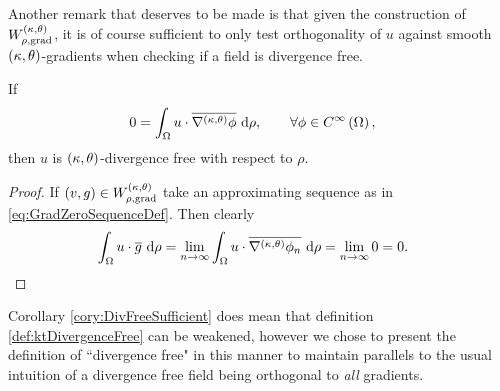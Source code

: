 Another remark that deserves to be made is that given the construction of $W^{\left( \kappa, \theta \right)}_{\rho,\mathrm{grad}}$, it is of course sufficient to only test orthogonality of $u$ against smooth $\left( \kappa, \theta \right)$-gradients when checking if a field is divergence free.
\begin{cory} \label{cory:DivFreeSufficient}
	If
	\begin{align*}
		0 &= \int_{\Omega} u\cdot\overline{\nabla^{\left( \kappa, \theta \right)}\phi}  \ \mathrm{d}\rho, \qquad\forall\phi\in C^{\infty}\left( \Omega \right),
	\end{align*}
	then $u$ is $\left( \kappa, \theta \right)$-divergence free with respect to $\rho$.
\end{cory}
\begin{proof}
	If $\left( v,g \right)\in W^{\left( \kappa, \theta \right)}_{\rho,\mathrm{grad}}$ take an approximating sequence as in \eqref{eq:GradZeroSequenceDef}.
	Then clearly
	\begin{align*}
		\int_{\Omega} u\cdot\overline{g}  \ \mathrm{d}\rho 
		&= \lim_{n\rightarrow\infty}\int_{\Omega} u\cdot\overline{\nabla^{\left( \kappa, \theta \right)}\phi_n}  \ \mathrm{d}\rho
		= \lim_{n\rightarrow\infty} 0 = 0.
	\end{align*}
\end{proof}
Corollary \ref{cory:DivFreeSufficient} does mean that definition \ref{def:ktDivergenceFree} can be weakened, however we chose to present the definition of ``divergence free" in this manner to maintain parallels to the usual intuition of a divergence free field being orthogonal to \emph{all} gradients.
